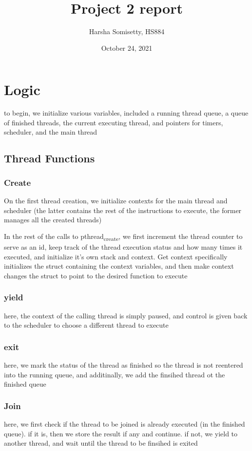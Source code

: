 \documentclass[11pt]{article}
\author{Harsha Somisetty, HS884}
\date{October 24, 2021}
\title{Project 2 report}
\begin{document}
\maketitle
\section*{Logic}
\label{sec:org565c378}
to begin, we initialize various variables, included a running thread queue, a queue of finished threads, the current executing thread, and pointers for timers, scheduler, and the main thread
\subsection*{Thread Functions}
\label{sec:org4ff0ee3}
\subsubsection*{Create}
\label{sec:org628435b}
On the first thread creation, we initialize contexts for the main thread and scheduler (the latter contains the rest of the instructions to execute, the former manages all the created threads)

In the rest of the calls to pthread\textsubscript{create}, we first increment the thread counter to serve as an id, keep track of the thread execution status and how many times it executed, and initialize it's own stack and context. Get context specifically initializes the struct containing the context variables, and then make context changes the struct to point to the desired function to execute
\subsubsection*{yield}
\label{sec:org8d452b0}
here, the context of the calling thread is simply paused, and control is given back to the scheduler to choose a different thread to execute
\subsubsection*{exit}
\label{sec:org8fa9e73}
here, we mark the status of the thread as finished so the thread is not reentered into the running queue, and additinally, we add the finsihed thread ot the finished queue
\subsubsection*{Join}
\label{sec:org6826417}
here, we first check if the thread to be joined is already executed (in the finished queue). if it is, then we store the result if any and continue. if not, we yield to another thread, and wait until the thread to be finsihed is exited
\end{document}
